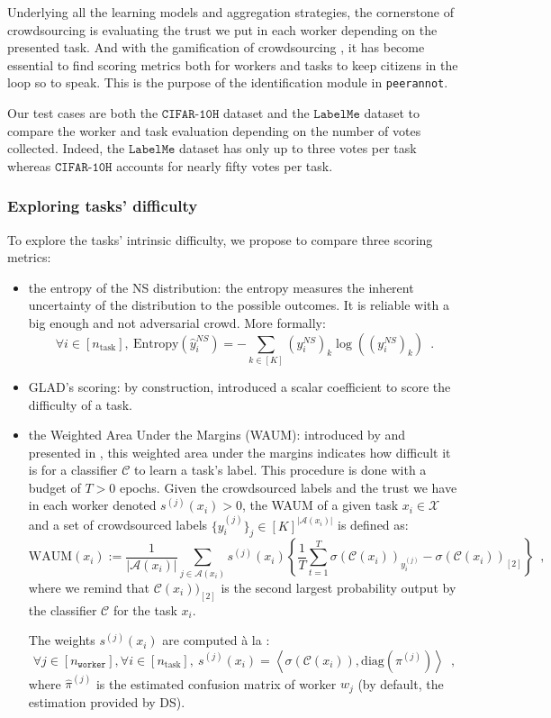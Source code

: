 Underlying all the learning models and aggregation strategies, the cornerstone of crowdsourcing is evaluating the trust we put in each worker depending on the presented task. And with the gamification of crowdsourcing \citep{plantgame2016,tinati2017investigation}, it has become essential to find scoring metrics both for workers and tasks to keep citizens in the loop so to speak.
This is the purpose of the identification module in \texttt{peerannot}.

Our test cases are both the $\texttt{CIFAR-10H}$ dataset and the $\texttt{LabelMe}$ dataset to compare the worker and task evaluation depending on the number of votes collected.
Indeed, the $\texttt{LabelMe}$ dataset has only up to three votes per task whereas $\texttt{CIFAR-10H}$ accounts for nearly fifty votes per task.

\subsubsection{Exploring tasks' difficulty}
To explore the tasks' intrinsic difficulty, we propose to compare three scoring metrics:

\begin{itemize}
    \item the entropy of the NS distribution: the entropy measures the inherent uncertainty of the distribution to the possible outcomes. It is reliable with a big enough and not adversarial crowd. More formally:
    $$
    \forall i\in [n_{\text{task}}],\ \mathrm{Entropy}(\hat{y}_i^{NS}) = -\sum_{k\in[K]} (y_i^{NS})_k \log\left((y_i^{NS})_k\right) \enspace.
    $$
    \item GLAD's scoring: by construction, \citet{whitehill_whose_2009} introduced a scalar coefficient to score the difficulty of a task.
    \item the Weighted Area Under the Margins (WAUM): introduced by \citet{lefort2022improve} and presented in , this weighted area under the margins indicates how difficult it is for a classifier $\mathcal{C}$ to learn a task's label. This procedure is done with a budget of $T>0$ epochs. Given the crowdsourced labels and the trust we have in each worker denoted $s^{(j)}(x_i)>0$, the WAUM of a given task $x_i\in\mathcal{X}$ and a set of crowdsourced labels $\{y_i^{(j)}\}_j \in [K]^{|\mathcal{A}(x_i)|}$ is defined as:
    $$\mathrm{WAUM}(x_i) := \frac{1}{|\mathcal{A}(x_i)|}\sum_{j\in\mathcal{A}(x_i)} s^{(j)}(x_i)\left\{\frac{1}{T}\sum_{t=1}^T  \sigma(\mathcal{C}(x_i))_{y_i^{(j)}} - \sigma(\mathcal{C}(x_i))_{[2]}\right\} \enspace,
    $$
    where we remind that $\mathcal{C}(x_i))_{[2]}$ is the second largest probability output by the classifier $\mathcal{C}$ for the task $x_i$.

    The weights $s^{(j)}(x_i)$ are computed à la \citet{servajean2017crowdsourcing}:
    $$
    \forall j\in[n_\texttt{worker}], \forall i\in[n_{\text{task}}],\ s^{(j)}(x_i) = \left\langle \sigma(\mathcal{C}(x_i)), \mathrm{diag}(\pi^{(j)})\right\rangle \enspace,
    $$
    where $\hat{\pi}^{(j)}$ is the estimated confusion matrix of worker $w_j$ (by default, the estimation provided by DS).
\end{itemize}

